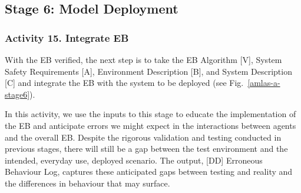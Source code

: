 \documentclass[runningheads]{llncs}
\begin{document}
\subsection{Stage 6: Model Deployment} \label{framework-stage6}
\vspace{-2ex}
\subsubsection*{Activity 15. Integrate EB}

With the EB verified, the next step is to take the EB Algorithm [V], System Safety Requirements [A], Environment Description [B], and System Description [C] and integrate the EB with the system to be deployed (see Fig.~\ref{amlas-a-stage6}). 

In this activity, we use the inputs to this stage to educate the implementation of the EB and anticipate errors we might expect in the interactions between agents and the overall EB. Despite the rigorous validation and testing conducted in previous stages, there will still be a gap between the test environment and the intended, everyday use, deployed scenario. The output, [DD] Erroneous Behaviour Log, captures these anticipated gaps between testing and reality and the differences in behaviour that may surface. 
\end{document}

